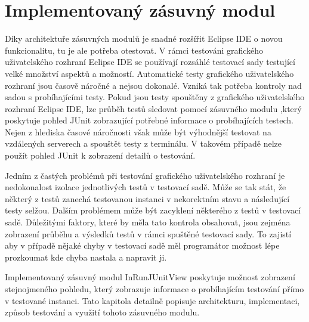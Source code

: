 \chapter{Implementovaný zásuvný modul}                                    %
Díky architektuře zásuvných modulů je snadné rozšířit Eclipse IDE o novou funkcionalitu, tu je ale potřeba otestovat. V rámci testováni grafického uživatelského rozhraní Eclipse IDE se používají rozsáhlé testovací sady testující velké množství aspektů a možností. Automatické testy grafického uživatelského rozhraní jsou časově náročné a nejsou dokonalé. Vzniká tak potřeba kontroly nad sadou s probíhajícími testy. Pokud jsou testy spouštěny z grafického uživatelského rozhraní Eclipse IDE, lze průběh testů sledovat pomocí zásuvného modulu  ,který poskytuje pohled JUnit zobrazující potřebné informace o probíhajících testech. Nejen z hlediska časové náročnosti však může být výhodnější testovat na vzdálených serverech a spouštět testy z terminálu. V takovém případě nelze použít pohled JUnit k zobrazení detailů o testování.

Jedním z častých problémů při testování grafického uživatelského rozhraní je nedokonalost izolace jednotlivých testů v testovací sadě. Může se tak stát, že některý z testů zanechá testovanou instanci v nekorektním stavu a následující testy selžou. Dalším problémem může být zacyklení některého z testů v testovací sadě. 
Důležitými faktory, které by měla tato kontrola obsahovat, jsou zejména zobrazení průběhu a výsledků testů v rámci spuštěné testovací sady. To zajistí aby v případě nějaké chyby v testovací sadě měl programátor možnost lépe prozkoumat kde chyba nastala a napravit ji.

Implementovaný zásuvný modul InRunJUnitView poskytuje možnost zobrazení stejnojmeného pohledu, který zobrazuje informace o probíhajícím testování přímo v testované instanci. Tato kapitola detailně popisuje architekturu, implementaci, způsob testování a využití tohoto zásuvného modulu.


